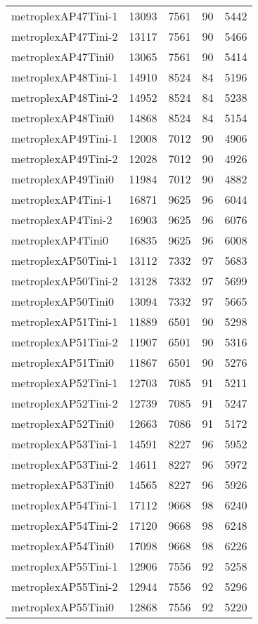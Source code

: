 \documentclass[../../../thesis.tex]{subfiles}
\begin{document}
\begin{longtable}{lrrrr}
metroplexAP47Tini-1 & 13093 & 7561 & 90 & 5442 \\
metroplexAP47Tini-2 & 13117 & 7561 & 90 & 5466 \\
metroplexAP47Tini0 & 13065 & 7561 & 90 & 5414 \\
metroplexAP48Tini-1 & 14910 & 8524 & 84 & 5196 \\
metroplexAP48Tini-2 & 14952 & 8524 & 84 & 5238 \\
metroplexAP48Tini0 & 14868 & 8524 & 84 & 5154 \\
metroplexAP49Tini-1 & 12008 & 7012 & 90 & 4906 \\
metroplexAP49Tini-2 & 12028 & 7012 & 90 & 4926 \\
metroplexAP49Tini0 & 11984 & 7012 & 90 & 4882 \\
metroplexAP4Tini-1 & 16871 & 9625 & 96 & 6044 \\
metroplexAP4Tini-2 & 16903 & 9625 & 96 & 6076 \\
metroplexAP4Tini0 & 16835 & 9625 & 96 & 6008 \\
metroplexAP50Tini-1 & 13112 & 7332 & 97 & 5683 \\
metroplexAP50Tini-2 & 13128 & 7332 & 97 & 5699 \\
metroplexAP50Tini0 & 13094 & 7332 & 97 & 5665 \\
metroplexAP51Tini-1 & 11889 & 6501 & 90 & 5298 \\
metroplexAP51Tini-2 & 11907 & 6501 & 90 & 5316 \\
metroplexAP51Tini0 & 11867 & 6501 & 90 & 5276 \\
metroplexAP52Tini-1 & 12703 & 7085 & 91 & 5211 \\
metroplexAP52Tini-2 & 12739 & 7085 & 91 & 5247 \\
metroplexAP52Tini0 & 12663 & 7086 & 91 & 5172 \\
metroplexAP53Tini-1 & 14591 & 8227 & 96 & 5952 \\
metroplexAP53Tini-2 & 14611 & 8227 & 96 & 5972 \\
metroplexAP53Tini0 & 14565 & 8227 & 96 & 5926 \\
metroplexAP54Tini-1 & 17112 & 9668 & 98 & 6240 \\
metroplexAP54Tini-2 & 17120 & 9668 & 98 & 6248 \\
metroplexAP54Tini0 & 17098 & 9668 & 98 & 6226 \\
metroplexAP55Tini-1 & 12906 & 7556 & 92 & 5258 \\
metroplexAP55Tini-2 & 12944 & 7556 & 92 & 5296 \\
metroplexAP55Tini0 & 12868 & 7556 & 92 & 5220 \\

\end{longtable}
\end{document}
